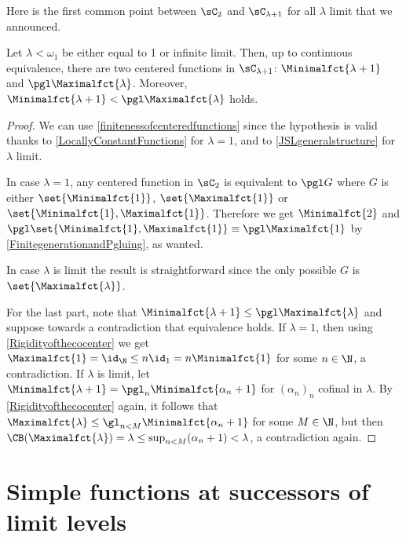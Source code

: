 Here is the first common point between $\sC_2$ and $\sC_{\lambda+1}$ for all $\lambda$ limit that we announced.

\begin{corollary}\label{cor:CenteredSucessor}
Let $\lambda<\omega_1$ be either equal to 1 or infinite limit.
Then, up to continuous equivalence, there are two centered functions in $\sC_{\lambda+1}$: $\Minimalfct{\lambda+1}$ and $\pgl\Maximalfct{\lambda}$. Moreover, $\Minimalfct{\lambda+1}<\pgl\Maximalfct{\lambda}$ holds.
\end{corollary}

\begin{proof}
We can use \cref{finitenessofcenteredfunctions} since the hypothesis is valid thanks to \cref{LocallyConstantFunctions} for $\lambda=1$, and to \cref{JSLgeneralstructure} for $\lambda$ limit.

In case $\lambda=1$, any centered function in $\sC_2$ is equivalent to $\pgl G$ where $G$ is either $\set{\Minimalfct{1}}$, $\set{\Maximalfct{1}}$ or $\set{\Minimalfct{1},\Maximalfct{1}}$.
Therefore we get $\Minimalfct{2}$ and $\pgl\set{\Minimalfct{1},\Maximalfct{1}}\equiv\pgl\Maximalfct{1}$ by \cref{FinitegenerationandPgluing}, as wanted.

In case $\lambda$ is limit the result is straightforward since the only possible $G$ is $\set{\Maximalfct{\lambda}}$. 

For the last part, note that $\Minimalfct{\lambda+1}\leq \pgl\Maximalfct{\lambda}$ and suppose towards a contradiction that equivalence holds. If $\lambda=1$, then using \cref{Rigidityofthecocenter} we get  $\Maximalfct{1}=\id_\N \leq n \id_1=n \Minimalfct{1}$ for some $n\in\N$, a contradiction. If $\lambda$ is limit, let $\Minimalfct{\lambda+1}=\pgl_n\Minimalfct{\alpha_n+1}$ for $(\alpha_n)_n$ cofinal in $\lambda$. By \cref{Rigidityofthecocenter} again, it follows that $\Maximalfct{\lambda}\leq \gl_{n<M} \Minimalfct{\alpha_n+1}$ for some $M\in \N$, but then $\CB(\Maximalfct{\lambda})=\lambda\leq \sup_{n<M}(\alpha_n +1)<\lambda$, a contradiction again. 
\end{proof}



\section{Simple functions at successors of limit levels}


